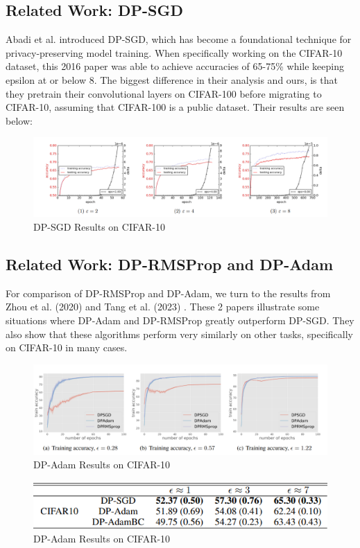 \subsection{Related Work: DP-SGD}\label{subsec:related-work}
Abadi et al. \cite{Abadi_2016_DeepLearningDifferentialPrivacy} introduced DP-SGD, which has become a foundational technique for
privacy-preserving model training. When specifically working on the CIFAR-10 dataset, this 2016 paper was able to achieve accuracies
of 65-75\% while keeping epsilon at or below 8. The biggest difference in their analysis and ours, is that they pretrain their convolutional
layers on CIFAR-100 before migrating to CIFAR-10, assuming that CIFAR-100 is a public dataset. Their results are seen below:
\begin{figure}[ht]
    \centering
    \includegraphics[width=\textwidth]{dp-sgd_results.PNG}
    \caption{DP-SGD Results on CIFAR-10 \cite{Abadi_2016_DeepLearningDifferentialPrivacy}}
    \label{fig:image_label}
\end{figure}

\subsection{Related Work: DP-RMSProp and DP-Adam}\label{subsec:related-work-RMSProp}
For comparison of DP-RMSProp and DP-Adam, we turn to the results from Zhou et al. (2020) \cite{zhou_2020_private_adaptive_algorithms} and Tang et al. (2023) \cite{tang2023dpadambcdpadamactuallydpsgd}.
These 2 papers illustrate some situations where DP-Adam and DP-RMSProp greatly outperform DP-SGD. They also show that these algorithms perform
very similarly on other tasks, specifically on CIFAR-10 in many cases.

\begin{figure}[ht]
    \centering
    \includegraphics[width=\textwidth]{zhou.PNG}
    \caption{DP-Adam Results on CIFAR-10 \cite{tang2023dpadambcdpadamactuallydpsgd}}
    \label{fig:image_label}
\end{figure}

\begin{figure}[ht]
    \centering
    \includegraphics[width=\textwidth]{dp-adam-rms-results.PNG}
    \caption{DP-Adam Results on CIFAR-10 \cite{tang2023dpadambcdpadamactuallydpsgd}}
    \label{fig:image_label}
\end{figure}
